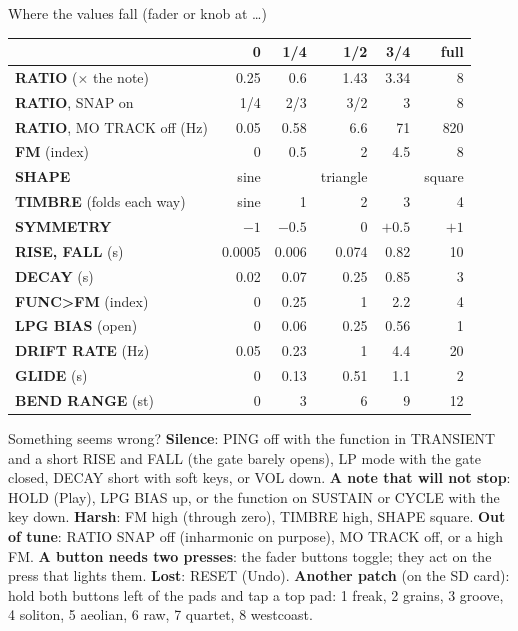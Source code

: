 \documentclass{article}
\newcommand{\OS}[1]{\textcolor{oscc}{#1}}
\newcommand{\FO}[1]{\textcolor{foldc}{#1}}
\newcommand{\FN}[1]{\textcolor{funcc}{#1}}
\newcommand{\LG}[1]{\textcolor{lpgc}{#1}}
\newcommand{\RN}[1]{\textcolor{rndc}{#1}}
\begin{document}
\begin{minipage}[t]{128mm}\vspace{0pt}
\begin{card}{Where the values fall (fader or knob at \dots)}
\fontsize{7.3}{8.9}\selectfont
\setlength{\tabcolsep}{3pt}
\begin{tabular}{@{}l r r r r r@{}}
 & 0 & 1/4 & 1/2 & 3/4 & full \\ \hline
\OS{\textbf{RATIO}} (\(\times\) the note) & 0.25 & 0.6 & 1.43 & 3.34 & 8 \\
\OS{\textbf{RATIO}}, SNAP on & 1/4 & 2/3 & 3/2 & 3 & 8 \\
\OS{\textbf{RATIO}}, MO TRACK off (Hz) & 0.05 & 0.58 & 6.6 & 71 & 820 \\
\OS{\textbf{FM}} (index) & 0 & 0.5 & 2 & 4.5 & 8 \\
\OS{\textbf{SHAPE}} & sine & & triangle & & square \\
\FO{\textbf{TIMBRE}} (folds each way) & sine & 1 & 2 & 3 & 4 \\
\FO{\textbf{SYMMETRY}} & \(-1\) & \(-0.5\) & 0 & \(+0.5\) & \(+1\) \\
\FN{\textbf{RISE, FALL}} (s) & 0.0005 & 0.006 & 0.074 & 0.82 & 10 \\
\LG{\textbf{DECAY}} (s) & 0.02 & 0.07 & 0.25 & 0.85 & 3 \\
\FN{\textbf{FUNC>FM}} (index) & 0 & 0.25 & 1 & 2.2 & 4 \\
\LG{\textbf{LPG BIAS}} (open) & 0 & 0.06 & 0.25 & 0.56 & 1 \\
\RN{\textbf{DRIFT RATE}} (Hz) & 0.05 & 0.23 & 1 & 4.4 & 20 \\
\textbf{GLIDE} (s) & 0 & 0.13 & 0.51 & 1.1 & 2 \\
\textbf{BEND RANGE} (st) & 0 & 3 & 6 & 9 & 12 \\
\end{tabular}
\end{card}

\begin{card}{Something seems wrong?}
\fontsize{7.3}{8.9}\selectfont
\textbf{Silence}: PING off with the function in TRANSIENT and a short RISE and FALL (the gate barely opens),
LP mode with the gate closed, DECAY short with soft keys, or VOL down.\quad
\textbf{A note that will not stop}: HOLD (Play), LPG BIAS up, or the function on SUSTAIN or CYCLE with the key down.\quad
\textbf{Harsh}: FM high (through zero), TIMBRE high, SHAPE square.\quad
\textbf{Out of tune}: RATIO SNAP off (inharmonic on purpose), MO TRACK off, or a high FM.\quad
\textbf{A button needs two presses}: the fader buttons toggle; they act on the press that lights them.\quad
\textbf{Lost}: RESET (Undo).\quad
\textbf{Another patch} (on the SD card): hold both buttons left of the pads and tap a top pad: 1 freak,
2 grains, 3 groove, 4 soliton, 5 aeolian, 6 raw, 7 quartet, 8 westcoast.
\end{card}
\end{minipage}
\end{document}
